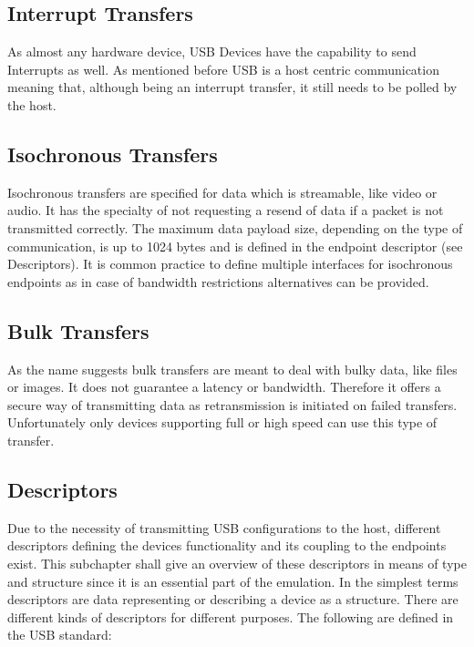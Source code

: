 \subsection{Interrupt Transfers}
As almost any hardware device, USB Devices have the capability to send Interrupts as well. As mentioned before USB is a host centric communication 
meaning that, although being an interrupt transfer, it still needs to be polled by the host. 
\subsection{Isochronous Transfers}
Isochronous transfers are specified for data which is streamable, like video or audio. It has the specialty of not requesting a resend of data if a packet is not transmitted correctly. The maximum data payload size, depending on the type of communication, is up to 1024 bytes and is defined in the endpoint descriptor (see Descriptors). It is common practice to define multiple interfaces for isochronous endpoints as in case of bandwidth restrictions alternatives can be provided.
\subsection{Bulk Transfers}
As the name suggests bulk transfers are meant to deal with bulky data, like files or images. It does not guarantee a latency or bandwidth.
Therefore it offers a secure way of transmitting data as retransmission is initiated on failed transfers. Unfortunately only devices supporting 
full or high speed can use this type of transfer. 
\subsection{Descriptors}
Due to the necessity of transmitting USB configurations to the host, different descriptors defining the devices functionality and its coupling to
the endpoints exist. This subchapter shall give an overview of these descriptors in means of type and structure since it is an essential part of the 
emulation. 
In the simplest terms descriptors are data representing or describing a device as a structure. There are different kinds of descriptors for different 
purposes. The following are defined in the USB standard:

